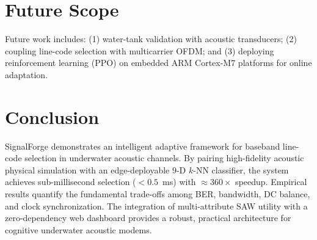 \documentclass[conference]{IEEEtran}
\begin{document}
\section{Future Scope}
Future work includes: (1) water-tank validation with acoustic transducers; (2) coupling line-code selection with multicarrier OFDM; and (3) deploying reinforcement learning (PPO) on embedded ARM Cortex-M7 platforms for online adaptation.

\section{Conclusion}
SignalForge demonstrates an intelligent adaptive framework for baseband line-code selection in underwater acoustic channels. By pairing high-fidelity acoustic physical simulation with an edge-deployable $9$-D $k$-NN classifier, the system achieves sub-millisecond selection ($< 0.5$~ms) with $\approx 360\times$ speedup. Empirical results quantify the fundamental trade-offs among BER, bandwidth, DC balance, and clock synchronization. The integration of multi-attribute SAW utility with a zero-dependency web dashboard provides a robust, practical architecture for cognitive underwater acoustic modems.
\end{document}
